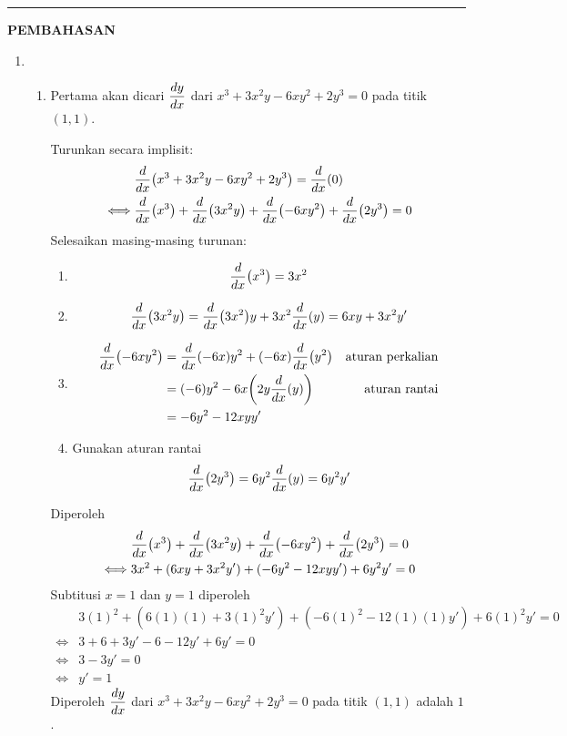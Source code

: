 \vspace{0.2cm}\hrule height 1pt\vspace{0.5cm}


\begin{center}
\textbf{\large{PEMBAHASAN}}
\end{center}
\begin{enumerate}[leftmargin=*, label={\arabic*}.]
\item 
    \begin{enumerate}[label={\alph*}.]
    \item Pertama akan dicari $\displaystyle\frac{dy}{dx}$ dari 
    $x^{3}+3x^{2}y-6xy^{2}+2y^{3}=0$ pada titik $(1,1)$.

    Turunkan secara implisit:
    \begin{align*}
        &\drv{x}{x^{3}+3x^{2}y-6xy^{2}+2y^{3}}=\drv{x}{0}\\
        \iff &\drv{x}{x^{3}}+\drv{x}{3x^{2}y}+\drv{x}{-6xy^{2}}
        +\drv{x}{2y^{3}} = 0
    \end{align*}
    Selesaikan masing-masing turunan:
        \begin{enumerate}[label={\arabic*})]
        \item \[
        \drv{x}{x^{3}} = 3x^{2}
        \]
        \item \[
        \drv{x}{3x^{2}y} = \drv{x}{3x^{2}}y+3x^{2}\drv{x}{y} = 6xy+3x^{2}y'
        \]
        \item 
        \begin{align*}
            \drv{x}{-6xy^{2}} &= \drv{x}{-6x}y^{2} + (-6x)\drv{x}{y^{2}}
            &\text{aturan perkalian}\\
            &=(-6)y^{2}-6x\brk*{2y\drv{x}{y}}
            &\text{aturan rantai}\\
            &=-6y^{2}-12xyy'
        \end{align*}
        \item Gunakan aturan rantai
        \begin{align*}
            \drv{x}{2y^{3}} = 6y^{2}\drv{x}{y} = 6y^{2}y'
        \end{align*}
        \end{enumerate}
    Diperoleh
    \begin{align*}
        &\drv{x}{x^{3}}+\drv{x}{3x^{2}y}+\drv{x}{-6xy^{2}}+\drv{x}{2y^{3}} = 0\\
        \iff &3x^{2}+(6xy+3x^{2}y')+(-6y^2-12xyy')+6y^{2}y'=0
    \end{align*}
    Subtitusi $x=1$ dan $y=1$ diperoleh
    \begin{align*}
        &3(1)^{2}+(6(1)(1)+3(1)^{2}y')+(-6(1)^{2}-12(1)(1)y')+6(1)^2y'=0\\
        \iff &3+6+3y'-6-12y'+6y'=0\\
        \iff &3-3y'=0\\
        \iff &y' = 1
    \end{align*}
    Diperoleh $\displaystyle\frac{dy}{dx}$ dari 
    $x^{3}+3x^{2}y-6xy^{2}+2y^{3}=0$ pada titik $(1,1)$ adalah $1$.


\end{enumerate}
\end{enumerate}
